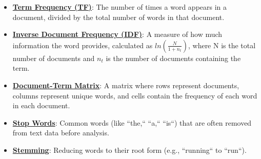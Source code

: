 \documentclass{article}%
\begin{document}
\begin{itemize}[leftmargin=*]
\item \href{https://purdue.brightspace.com/d2l/common/assets/pdfjs-d2l-dist/1.0.14-legacy/web/viewer.html?file=\%2Fcontent\%2Fenforced\%2F1095465-WL.202510.CS24200.LE1\%2F05L1-parsing.pdf\%3Fou\%3D1095465\&lang=en-us\&container=d2l-fileviewer-rendered-pdf\&fullscreen=d2l-fileviewer-rendered-pdf-dialog\&height=667#page=25}{\textbf{Term Frequency (TF)}}: The number of times a word appears in a document, divided by the total number of words in that document.%
\item \href{https://purdue.brightspace.com/d2l/common/assets/pdfjs-d2l-dist/1.0.14-legacy/web/viewer.html?file=\%2Fcontent\%2Fenforced\%2F1095465-WL.202510.CS24200.LE1\%2F05L1-parsing.pdf\%3Fou\%3D1095465\&lang=en-us\&container=d2l-fileviewer-rendered-pdf\&fullscreen=d2l-fileviewer-rendered-pdf-dialog\&height=667#page=25}{\textbf{Inverse Document Frequency (IDF)}}: A measure of how much information the word provides, calculated as $ln(\frac{N}{1 + n_t})$, where N is the total number of documents and $n_t$ is the number of documents containing the term.%
\item \href{https://purdue.brightspace.com/d2l/common/assets/pdfjs-d2l-dist/1.0.14-legacy/web/viewer.html?file=\%2Fcontent\%2Fenforced\%2F1095465-WL.202510.CS24200.LE1\%2F05L1-parsing.pdf\%3Fou\%3D1095465\&lang=en-us\&container=d2l-fileviewer-rendered-pdf\&fullscreen=d2l-fileviewer-rendered-pdf-dialog\&height=667#page=26}{\textbf{Document-Term Matrix}}: A matrix where rows represent documents, columns represent unique words, and cells contain the frequency of each word in each document.%
\item \href{https://purdue.brightspace.com/d2l/common/assets/pdfjs-d2l-dist/1.0.14-legacy/web/viewer.html?file=\%2Fcontent\%2Fenforced\%2F1095465-WL.202510.CS24200.LE1\%2F05L1-parsing.pdf\%3Fou\%3D1095465\&lang=en-us\&container=d2l-fileviewer-rendered-pdf\&fullscreen=d2l-fileviewer-rendered-pdf-dialog\&height=667#page=27}{\textbf{Stop Words}}: Common words (like ``the,`` ``a,`` ``is``) that are often removed from text data before analysis.%
\item \href{https://purdue.brightspace.com/d2l/common/assets/pdfjs-d2l-dist/1.0.14-legacy/web/viewer.html?file=\%2Fcontent\%2Fenforced\%2F1095465-WL.202510.CS24200.LE1\%2F05L1-parsing.pdf\%3Fou\%3D1095465\&lang=en-us\&container=d2l-fileviewer-rendered-pdf\&fullscreen=d2l-fileviewer-rendered-pdf-dialog\&height=667#page=27}{\textbf{Stemming}}: Reducing words to their root form (e.g., ``running`` to ``run``).%
\end{itemize}
\end{document}
